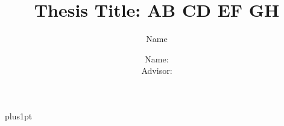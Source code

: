 \documentclass[12pt]{fulbrightthesis}
\title{ Thesis Title: AB CD EF GH }
\author{Name}
\author{Name:      \\ Advisor:  }             %
\begin{document}
\baselineskip=18pt plus1pt

\setcounter{secnumdepth}{3}
\setcounter{tocdepth}{3}


\maketitle                  %

\begin{romanpages}          %
\tableofcontents            %
\listoffigures              %
\end{romanpages}            %





\appendix




\printbibliography 
%
%
\end{document}
